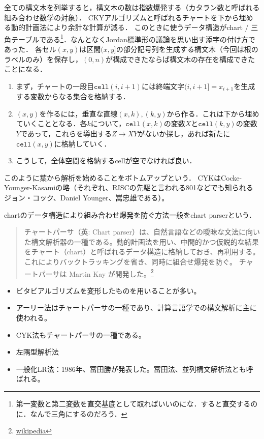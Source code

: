 \documentclass[uplatex, dvipdfmx]{jsreport}
\begin{document}
\begin{discussion}
    全ての構文木を列挙すると，構文木の数は指数爆発する（カタラン数と呼ばれる組み合わせ数学の対象）．
    CKYアルゴリズムと呼ばれるチャートを下から埋める動的計画法により余計な計算が減る．
    このときに使うデータ構造がchart / 三角テーブルである\footnote{第一変数と第二変数を直交基底として取ればいいのにな．すると直交するのに．なんで三角にするのだろう．}．なんとなくJordan標準形の議論を思い出す添字の付け方であった．
    各セル$(x,y)$は区間$(x,y]$の部分記号列を生成する構文木（今回は根のラベルのみ）を保存し，$(0,n)$が構成できたならば構文木の存在を構成できたことになる．
    \begin{enumerate}
        \item まず，チャートの一段目$\mathtt{cell}(i,i+1)$には終端文字$(i,i+1]=x_{i+1}$を生成する変数からなる集合を格納する．
        \item $(x,y)$を作るには，垂直な直線$(x,k),(k,y)$から作る．これは下から埋めていくこととなる．各$k$について，$\mathtt{cell}(x,k)$の変数$X$と$\mathtt{cell}(k,y)$の変数$Y$であって，これらを導出する$Z\to XY$がないか探し，あれば新たに$\mathtt{cell}(x,y)$に格納していく．
        \item こうして，全体空間を格納するcellが空でなければ良い．
    \end{enumerate}
    このように葉から解析を始めることをボトムアップという．
    CYKはCocke-Younger-Kasamiの略（それぞれ、RISCの先駆と言われる801などでも知られるジョン・コック、Daniel Younger、嵩忠雄である）。
\end{discussion}
\begin{remark}
    chartのデータ構造により組み合わせ爆発を防ぐ方法一般をchart parserという．
    \begin{quote}
        チャートパーサ（英: Chart parser）は、自然言語などの曖昧な文法に向いた構文解析器の一種である。動的計画法を用い、中間的かつ仮説的な結果をチャート（chart）と呼ばれるデータ構造に格納しておき、再利用する。これによりバックトラッキングを省き、同時に組合せ爆発を防ぐ。
        チャートパーサは Martin Kay が開発した。\footnote{\href{https://ja.wikipedia.org/wiki/チャートパーサ}{wikipedia}}
    \end{quote}
    \begin{itemize}
        \item ビタビアルゴリズムを変形したものを用いることが多い。
        \item アーリー法はチャートパーサの一種であり、計算言語学での構文解析に主に使われる。
        \item CYK法もチャートパーサの一種である。
        \item 左隅型解析法
        \item 一般化LR法：1986年、冨田勝が発表した。冨田法、並列構文解析法とも呼ばれる。
    \end{itemize}
\end{remark}
\end{document}
